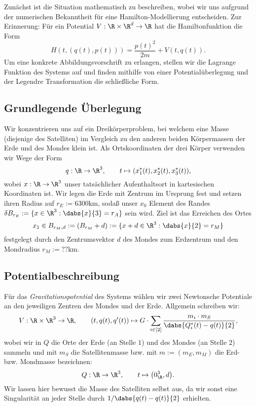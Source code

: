\documentclass{subfiles}
\begin{document}
    

    Zunächst ist die Situation mathematisch zu beschreiben, wobei wir uns aufgrund der numerischen Bekanntheit für eine Hamilton-Modellierung entscheiden. Zur Erinnerung: Für ein Potential $V:\R\times\R^d\to\R$ hat die Hamiltonfunktion die Form 
    \[
        H(t,(q(t),p(t))) = \frac{p(t)^2}{2m} + V(t,q(t)).
    \]
    Um eine konkrete Abbildungsvorschrift zu erlangen, stellen wir die Lagrange Funktion des Systems auf und finden mithilfe von einer Potentialüberlegung und der Legendre Transformation die schließliche Form. 

    \subsection*{Grundlegende Überlegung}
        Wir konzentrieren uns auf ein Dreikörperproblem, bei welchem eine Masse (diejenige des Satelliten) im Vergleich zu den anderen beiden Körpermassen der Erde und des Mondes klein ist. Als Ortskoordinaten der drei Körper verwenden wir Wege der Form 
        \[
            q:\R\to\R^3,\qquad t\mapsto (x_1^*(t),x_2^*(t),x_3^*(t)),
        \]
        wobei $x:\R\to\R^3$ unser tatsächlicher Aufenthaltsort in kartesischen Koordinaten ist. Wir legen die Erde mit Zentrum im Ursprung fest und setzen ihren Radius auf $r_E:=6300\si{\kilo\metre}$, sodaß unser $x_0$ Element des Randes $\delta B_{r_E}:=\{x\in\R^3:\dabs{x}{3} = r_A\}$ sein wird. Ziel ist das Erreichen des Ortes
        \[
            x_1\in B_{r_M,d}:=(B_{r_M}+d):=\{x + d\in\R^3:\dabs{x}{2} = r_M\}
        \]
        festgelegt durch den Zentrumsvektor $d$ des Mondes zum Erdzentrum und den Mondradius $r_M:=??\si{\kilo\metre}$.

    \subsection*{Potentialbeschreibung}
        Für das \emph{Gravitationspotential} des Systems wählen wir zwei Newtonsche Potentiale an den jeweiligen Zentren des Mondes und der Erde. Allgemein schreiben wir:
        \[
            V:\R\times\R^3\to \R,\qquad (t,q(t),q'(t))\mapsto G\cdot\sum_{i\in[2]}\frac{m_i\cdot m_S}{\dabs{Q_i^*(t) - q(t)}{2}},
        \]
        wobei wir in $Q$ die Orte der Erde (an Stelle $1$) und des Mondes (an Stelle $2$) sammeln und mit $m_S$ die Satellitenmasse bzw. mit $m:=(m_E,m_M)$ die Erd- bzw. Mondmasse bezeichnen:
        \[
            Q:\R\to\R^3,\qquad t\mapsto \bigl(0_\R^3,d\bigr).
        \]
        Wir lassen hier bewusst die Masse des Satelliten selbst aus, da wir sonst eine Singularität an jeder Stelle durch $1/\dabs{q(t)-q(t)}{2}$ erhielten. 
\end{document}
